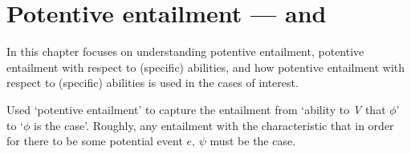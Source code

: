 \chapter{Potentive entailment --- \AR{} and \WR{}}
\label{cha:potent-infer-attr}

\begin{note}[Overview]
  In this chapter focuses on understanding potentive entailment, potentive entailment with respect to (specific) abilities, and how potentive entailment with respect to (specific) abilities is used in the cases of interest.
\end{note}

\begin{note}
  Used `potentive entailment' to capture the entailment from `ability to \emph{V} that \(\phi\)' to `\(\phi\) is the case'.
  Roughly, any entailment with the characteristic that in order for there to be some potential event \(e\), \(\psi\) must be the case.
\end{note}

